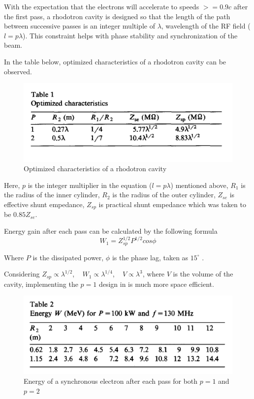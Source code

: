 \documentclass{article}
\begin{document}
With the expectation that the electrons will accelerate to speeds $>=0.9 c$ after the first pass, a rhodotron cavity is designed so that the length of the path between successive passes is an integer multiple of $\lambda$, wavelength of the RF field ($l=p\lambda \label{eq:lpl}$).
This constraint helps with  phase stability and synchronization of the beam.

In the table below, optimized characteristics of a rhodotron cavity can be observed. 
\begin{figure}[H]
    \centering
    \includegraphics[width=.9\textwidth]{../../../figures/pottier_table1.png}
    \caption{Optimized characteristics of a rhodotron cavity \cite{rhodo_pottier}}
    \label{fig:pottier_table1}
\end{figure}

Here, $p$ is the integer multiplier in the equation ($l=p\lambda$) mentioned above, $R_1$ is the radius of the inner cylinder, $R_2$ is the radius of the outer cylinder, 
$Z_{se}$ is effective shunt empedance, $Z_{sp}$ is practical shunt empedance which was taken to be $0.85 Z_{se}$.

Energy gain after each pass can be calculated by the following formula \cite{rhodo_pottier}
\begin{equation}
    \label{eq:W_gain_each_pass_pottier}
    W_1 = Z_{sp}^{1/2} P^{1/2} cos \phi  
\end{equation}

Where $P$ is the dissipated power, $\phi$ is the phase lag, taken as $15^\circ$ \cite{rhodo_pottier}. 

Considering $Z_{sp} \propto \lambda^{1/2}$, \,\,\, $W_1 \propto \lambda^{1/4}$, \,\,\,   $V \propto \lambda^3$, where $V$ is the volume of the cavity, implementing the $p=1$ design in  is much more space efficient.
\begin{figure}[H]
    \centering
    \includegraphics[width=.9\textwidth]{../../../figures/pottier_table2.png}
    \caption{Energy of a synchronous electron after each pass for both $p=1$ and $p=2$ \cite{rhodo_pottier}}
    \label{fig:pottier_table2}
\end{figure}
\end{document}
